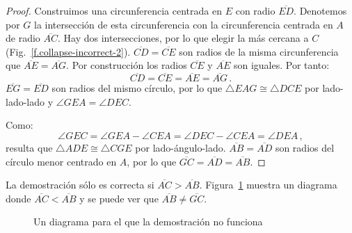 \begin{proof}
Construimos una circunferencia centrada en $E$ con radio $\overline{ED}$. Denotemos por $G$ la intersección de esta circunferencia con la circunferencia centrada en $A$ de radio $\overline{AC}$. Hay dos intersecciones, por lo que elegir la más cercana a $C$ (Fig.~\ref{f.collapse-incorrect-2}).
$\overline{CD}=\overline{CE}$ son radios de la misma circunferencia que $\overline{AE}=\overline{AG}$. Por construcción los radios $\overline{CE}$ y $\overline{AE}$ son iguales. Por tanto:
\[
\overline{CD} = \overline{CE} = \overline{AE} = \overline{AG}\,.
\]
$\overline{EG} = \overline{ED}$ son radios del mismo círculo, por lo que $\triangle EAG\cong \triangle DCE$ por lado-lado-lado y $\angle GEA = \angle DEC$.

Como:
\[
\angle GEC = \angle GEA \!-\!\angle CEA = \angle DEC\!-\!\angle CEA = \angle DEA\,,
\]
resulta que $\triangle ADE\cong\triangle CGE$ por lado-ángulo-lado. $\overline{AB}=\overline{AD}$ son radios del círculo menor centrado en $A$, por lo que $\overline{GC}=\overline{AD}=\overline{AB}$.
\end{proof}

La demostración sólo es correcta si $\overline{AC}>\overline{AB}$.  Figura~\ref{f.collapse-incorrect-4} muestra un diagrama donde $\overline{AC}<\overline{AB}$ y se puede ver que $\overline{AB}\neq\overline{GC}$.

\begin{figure}[b]
\begin{center}
\end{center}
\caption{Un diagrama para el que la demostración no funciona}\label{f.collapse-incorrect-4}
\end{figure}


